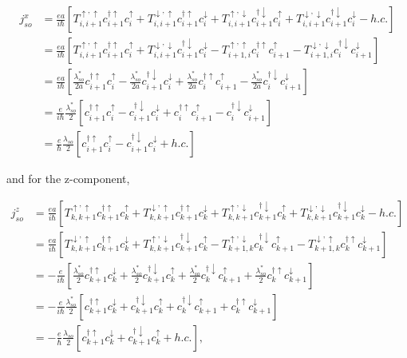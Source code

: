 \documentclass[10pt,prb,showpacs,amssymb,floatfix]{revtex4-1}
\newcommand{\dna}{\downarrow}
\newcommand{\nn}{\nonumber}
\newcommand{\upa}{\uparrow}
\begin{document}
\begin{align}
j_{so}^x &=\frac{ea}{i\hbar} [T^{\upa,\upa}_{i,i+1} c^{\dagger\upa}_{i+1} c^{\upa}_i+T^{\dna,\upa}_{i,i+1} c^{\dagger\upa}_{i+1} c^{\dna}_i + T^{\upa,\dna}_{i,i+1} c^{\dagger\dna}_{i+1} c^{\upa}_i+T^{\dna,\dna}_{i,i+1} c^{\dagger\dna}_{i+1} c^{\dna}_i   - h.c.] \nn\\&= \frac{ea}{i\hbar} [T^{\upa,\upa}_{i,i+1} c^{\dagger\upa}_{i+1} c^{\upa}_i+T^{\dna,\dna}_{i,i+1} c^{\dagger\dna}_{i+1} c^{\dna}_i   - T^{\upa,\upa}_{i+1,i} c^{\dagger\upa}_{i} c^{\upa}_{i+1}-T^{\dna,\dna}_{i+1,i} c^{\dagger\dna}_{i} c^{\dna}_{i+1} ] \nn\\
&= \frac{ea}{i\hbar} [\frac{\lambda_{so}^*}{2a} c^{\dagger\upa}_{i+1} c^{\upa}_i-\frac{\lambda_{so}^*}{2a} c^{\dagger\dna}_{i+1} c^{\dna}_i   + \frac{\lambda_{so}^*}{2a}c^{\dagger\upa}_{i} c^{\upa}_{i+1} -\frac{\lambda_{so}^*}{2a} c^{\dagger\dna}_{i} c^{\dna}_{i+1} ] \nn\\
&= \frac{e}{i\hbar}\frac{\lambda_{so}^*}{2} [ c^{\dagger\upa}_{i+1} c^{\upa}_i-c^{\dagger\dna}_{i+1} c^{\dna}_i   + c^{\dagger\upa}_{i} c^{\upa}_{i+1} -c^{\dagger\dna}_{i} c^{\dna}_{i+1} ] \nn\\
&=\frac{e}{\hbar}\frac{\lambda_{so}}{2} [ c^{\dagger\upa}_{i+1} c^{\upa}_i-c^{\dagger\dna}_{i+1} c^{\dna}_i   +h.c. ] 
\end{align}

and for the z-component,

\begin{align}
j_{so}^z &=\frac{ea}{i\hbar} [T^{\upa,\upa}_{k,k+1} c^{\dagger\upa}_{k+1} c^{\upa}_k+T^{\dna,\upa}_{k,k+1} c^{\dagger\upa}_{k+1} c^{\dna}_k + T^{\upa,\dna}_{k,k+1} c^{\dagger\dna}_{k+1} c^{\upa}_k+T^{\dna,\dna}_{k,k+1} c^{\dagger\dna}_{k+1} c^{\dna}_k   - h.c.] \nn\\ &=\frac{ea}{i\hbar} [T^{\dna,\upa}_{k,k+1} c^{\dagger\upa}_{k+1} c^{\dna}_k + T^{\upa,\dna}_{k,k+1} c^{\dagger\dna}_{k+1} c^{\upa}_k   - T^{\upa,\dna}_{k+1,k} c^{\dagger\dna}_{k} c^{\upa}_{k+1} - T^{\dna,\upa}_{k+1,k} c^{\dagger\upa}_{k} c^{\dna}_{k+1}  ] \nn\\
&=-\frac{e}{i\hbar} [\frac{\lambda_{so}^*}{2} c^{\dagger\upa}_{k+1} c^{\dna}_k + \frac{\lambda_{so}^*}{2} c^{\dagger\dna}_{k+1} c^{\upa}_k   +\frac{\lambda_{so}^*}{2} c^{\dagger\dna}_{k} c^{\upa}_{k+1} +\frac{\lambda_{so}^*}{2} c^{\dagger\upa}_{k} c^{\dna}_{k+1}  ] \nn\\
&=-\frac{e}{i\hbar}\frac{\lambda_{so}^*}{2} [ c^{\dagger\upa}_{k+1} c^{\dna}_k +c^{\dagger\dna}_{k+1} c^{\upa}_k   + c^{\dagger\dna}_{k} c^{\upa}_{k+1} + c^{\dagger\upa}_{k} c^{\dna}_{k+1}  ] \nn\\
&=-\frac{e}{\hbar}\frac{\lambda_{so}}{2} [ c^{\dagger\upa}_{k+1} c^{\dna}_k +c^{\dagger\dna}_{k+1} c^{\upa}_k   + h.c.  ],
\label{corriente3}
\end{align}
\end{document}
